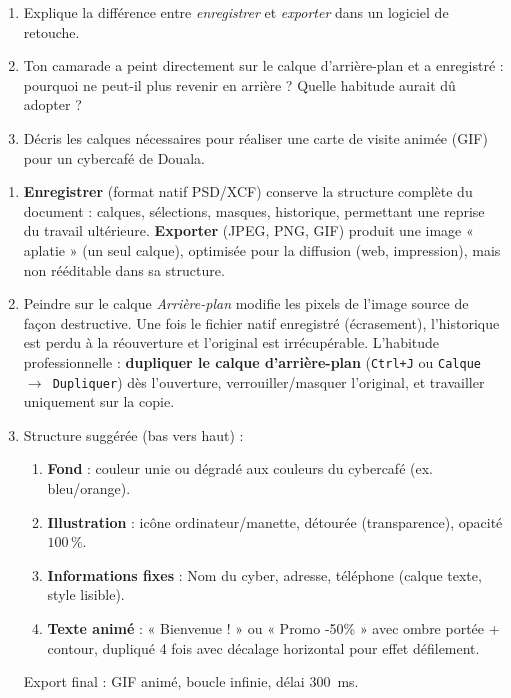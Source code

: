 \documentclass[11pt]{article}
\begin{document}
\begin{exercice}
\begin{enumerate}
\item Explique la différence entre \emph{enregistrer} et \emph{exporter} dans un logiciel de retouche.
\item Ton camarade a peint directement sur le calque d'arrière-plan et a enregistré : pourquoi ne peut-il plus revenir en arrière ? Quelle habitude aurait dû adopter ?
\item Décris les calques nécessaires pour réaliser une carte de visite animée (GIF) pour un cybercafé de Douala.
\end{enumerate}
\end{exercice}

\begin{corrige}[Exercice 13]
\begin{enumerate}
\item \textbf{Enregistrer} (format natif PSD/XCF) conserve la structure complète du document : calques, sélections, masques, historique, permettant une reprise du travail ultérieure. \textbf{Exporter} (JPEG, PNG, GIF) produit une image « aplatie » (un seul calque), optimisée pour la diffusion (web, impression), mais non rééditable dans sa structure.
\item Peindre sur le calque \emph{Arrière-plan} modifie les pixels de l'image source de façon destructive. Une fois le fichier natif enregistré (écrasement), l'historique est perdu à la réouverture et l'original est irrécupérable. L'habitude professionnelle : \textbf{dupliquer le calque d'arrière-plan} (\texttt{Ctrl+J} ou \texttt{Calque $\to$ Dupliquer}) dès l'ouverture, verrouiller/masquer l'original, et travailler uniquement sur la copie.
\item Structure suggérée (bas vers haut) :
  \begin{enumerate}
  \item \textbf{Fond} : couleur unie ou dégradé aux couleurs du cybercafé (ex. bleu/orange).
  \item \textbf{Illustration} : icône ordinateur/manette, détourée (transparence), opacité $100\,\%$.
  \item \textbf{Informations fixes} : Nom du cyber, adresse, téléphone (calque texte, style lisible).
  \item \textbf{Texte animé} : « Bienvenue ! » ou « Promo -50\% » avec ombre portée + contour, dupliqué 4 fois avec décalage horizontal pour effet défilement.
  \end{enumerate}
  Export final : GIF animé, boucle infinie, délai $300$~ms.
\end{enumerate}
\end{corrige}
\end{document}
